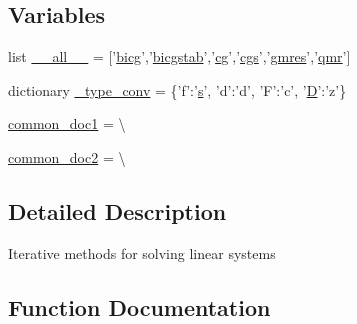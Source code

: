 \subsection*{Variables}
\begin{DoxyCompactItemize}
\item 
list \hyperlink{namespacescipy_1_1sparse_1_1linalg_1_1isolve_1_1iterative_a86efdae66fc6b6bd34a8912da00967cb}{\+\_\+\+\_\+all\+\_\+\+\_\+} = \mbox{[}'\hyperlink{namespacescipy_1_1sparse_1_1linalg_1_1isolve_1_1iterative_a412aeb6cd696b0cf8a9f88696f4c322a}{bicg}','\hyperlink{namespacescipy_1_1sparse_1_1linalg_1_1isolve_1_1iterative_a6b1028494045b7bc13dc7eb4378142c4}{bicgstab}','\hyperlink{namespacescipy_1_1sparse_1_1linalg_1_1isolve_1_1iterative_a7cd077c191170b5bd5cd1a1b04309cef}{cg}','\hyperlink{namespacescipy_1_1sparse_1_1linalg_1_1isolve_1_1iterative_af7bc36a2aa10d31ce6f4b5afb2904c16}{cgs}','\hyperlink{namespacescipy_1_1sparse_1_1linalg_1_1isolve_1_1iterative_abc26af16f67fdee14c5f62024ac0e8e0}{gmres}','\hyperlink{namespacescipy_1_1sparse_1_1linalg_1_1isolve_1_1iterative_abda5650369b9bb1efec78bf061b45297}{qmr}'\mbox{]}
\item 
dictionary \hyperlink{namespacescipy_1_1sparse_1_1linalg_1_1isolve_1_1iterative_ace48e20fdda7552ca3a4b5480574d603}{\+\_\+type\+\_\+conv} = \{'f'\+:'\hyperlink{indexexpr_8h_ae024b0db549122b44c349ae28ec990dc}{s}', 'd'\+:'d', 'F'\+:'c', '\hyperlink{odrpack_8h_a7dae6ea403d00f3687f24a874e67d139}{D}'\+:'z'\}
\item 
\hyperlink{namespacescipy_1_1sparse_1_1linalg_1_1isolve_1_1iterative_a275fb00a021878c1a4810436a392b2a1}{common\+\_\+doc1} = \textbackslash{}
\item 
\hyperlink{namespacescipy_1_1sparse_1_1linalg_1_1isolve_1_1iterative_a6b0a58aca91ce72c8172a26896a29985}{common\+\_\+doc2} = \textbackslash{}
\end{DoxyCompactItemize}


\subsection{Detailed Description}
\begin{DoxyVerb}Iterative methods for solving linear systems\end{DoxyVerb}
 

\subsection{Function Documentation}
\hypertarget{namespacescipy_1_1sparse_1_1linalg_1_1isolve_1_1iterative_a412aeb6cd696b0cf8a9f88696f4c322a}{}
